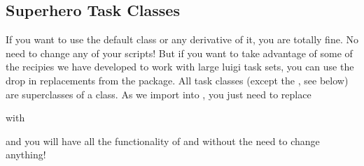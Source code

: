 \documentclass[letterpaper,10pt,english]{sphinxmanual}
\begin{document}
\subsection{Super\sphinxhyphen{}hero Task Classes}
\label{\detokenize{documentation/api:super-hero-task-classes}}
If you want to use the default  class or any derivative of it,
you are totally fine.
No need to change any of your scripts!
But if you want to take advantage of some of the recipies we have developed
to work with large luigi task sets, you can use the drop in replacements
from the  package.
All task classes (except the {\hyperref[\detokenize{documentation/api:b2luigi.DispatchableTask}]{}}, see below) are superclasses of
a  class.
As we import  into , you just need to replace

\begin{sphinxVerbatim}[commandchars=\\\{\}]
 
\end{sphinxVerbatim}

with

\begin{sphinxVerbatim}[commandchars=\\\{\}]
   
\end{sphinxVerbatim}

and you will have all the functionality of  and 
without the need to change anything!
\end{document}
